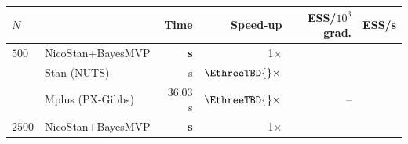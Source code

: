 \begin{table}[H]
{%
\begin{tabular}{llrrrr}
\toprule
$N$ & & Time & Speed-up & ESS/$10^3$ grad. & ESS/s \\
\midrule
$500$    & NicoStan+BayesMVP & \textbf{\EthreeTBD{} s} & 1$\times$ & \EthreeTBD{} & \EthreeTBD{} \\
         & Stan (NUTS)       & \EthreeTBD{} s & $\EthreeTBD{}\times$ & \EthreeTBD{} & \EthreeTBD{} \\
         & Mplus (PX-Gibbs)  & 36.03 s & $\EthreeTBD{}\times$ & -- & \EthreeTBD{} \\
\midrule
$2500$   & NicoStan+BayesMVP & \textbf{\EthreeTBD{} s} & 1$\times$ & \EthreeTBD{} & \EthreeTBD{} \\

\end{tabular}}
\end{table}
